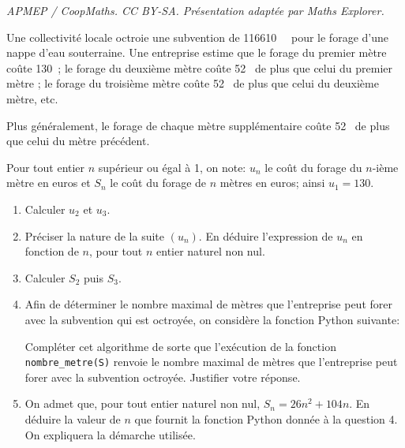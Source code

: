 \documentclass[10pt]{article}
\providecommand{\euro}{\texteuro}
\providecommand{\np}[2][]{{#2~#1}}
\providecommand{\euro}{{\text{€}}}
\renewcommand{\euro}{\ifmmode\text{\texteuro}\else\texteuro\fi}
\begin{document}
\noindent\textit{APMEP / CoopMaths. CC BY-SA. Présentation adaptée par Maths Explorer.}\par\medskip
\bigskip

Une collectivité locale octroie une subvention de \np{116610}~\euro{} pour le forage d'une nappe d'eau souterraine. Une entreprise estime que le forage du premier mètre coûte 130~\euro; le
forage du deuxième mètre coûte 52~\euro{} de plus que celui du premier mètre ; le forage du
troisième mètre coûte 52~\euro{} de plus que celui du deuxième mètre, etc.

Plus généralement, le forage de chaque mètre supplémentaire coûte 52~\euro{} de plus que celui
du mètre précédent.

Pour tout entier $n$ supérieur ou égal à 1, on note: $u_n$ le coût du forage du $n$-ième mètre en
euros et $S_n$ le coût du forage de $n$ mètres en euros; ainsi $u_1=130$.

\medskip

\begin{enumerate}
\item Calculer $u_2$ et $u_3$.
\item Préciser la nature de la suite $\left(u_n\right)$. En déduire l'expression de $u_n$ en fonction de $n$, pour tout $n$ entier naturel non nul.
\item Calculer $S_2$ puis $S_3$.
\item Afin de déterminer le nombre maximal de mètres que l'entreprise peut forer avec la subvention qui est octroyée, on considère la fonction Python suivante:

\begin{center}
\end{center}
Compléter cet algorithme de sorte que l'exécution de la fonction \verb!nombre_metre(S)! renvoie le nombre maximal de mètres que l'entreprise peut forer avec la subvention octroyée. Justifier votre réponse.

\item On admet que, pour tout entier naturel non nul, $S_n=26n^2 +104n$. En déduire la valeur de
$n$ que fournit la fonction Python donnée à la question 4. On expliquera la démarche utilisée.
\end{enumerate}
\end{document}
